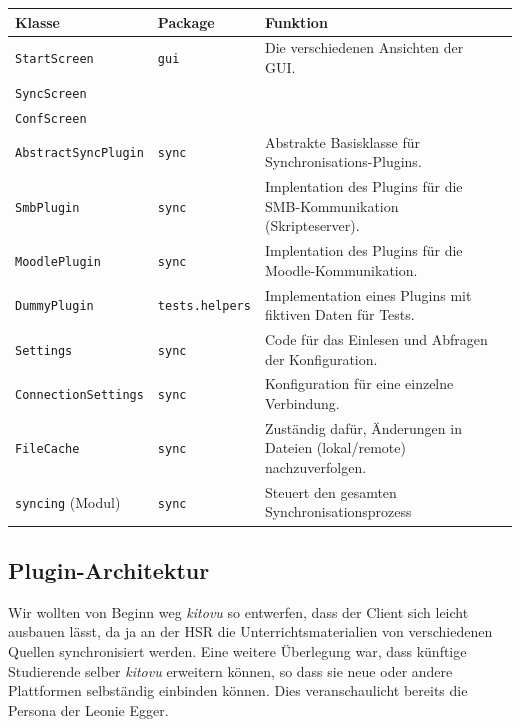 \documentclass[a4paper]{article}
\begin{document}
\begin{tabulary}{\linewidth}{llLl}
	\toprule
	Klasse & Package & Funktion \\
	\midrule
  \verb|StartScreen| & \verb|gui| & Die verschiedenen Ansichten der GUI. \\
  \verb|SyncScreen| & & \\
  \verb|ConfScreen| & & \\
  \hline
  \verb|AbstractSyncPlugin| & \verb|sync| & Abstrakte Basisklasse für Synchronisations-Plugins. \\
  \verb|SmbPlugin| & \verb|sync| & Implentation des Plugins für die SMB-Kommunikation (Skripteserver). \\
  \verb|MoodlePlugin| & \verb|sync| & Implentation des Plugins für die Moodle-Kommunikation. \\
  \verb|DummyPlugin| & \verb|tests.helpers| & Implementation eines Plugins mit fiktiven Daten für Tests. \\
  \hline
  \verb|Settings| & \verb|sync| & Code für das Einlesen und Abfragen der Konfiguration. \\
  \verb|ConnectionSettings| & \verb|sync| & Konfiguration für eine einzelne Verbindung. \\
  \hline
  \verb|FileCache| & \verb|sync| & Zuständig dafür, Änderungen in Dateien (lokal/remote) nachzuverfolgen. \\
  \verb|syncing| (Modul) & \verb|sync| & Steuert den gesamten Synchronisationsprozess \\
	\bottomrule
\end{tabulary}

\pagebreak

\subsection{Plugin-Architektur}

Wir wollten von Beginn weg \emph{kitovu} so entwerfen, dass der Client sich leicht ausbauen lässt, da ja an der HSR die Unterrichtsmaterialien von verschiedenen Quellen synchronisiert werden. Eine weitere Überlegung war, dass künftige Studierende selber \emph{kitovu} erweitern können, so dass sie neue oder andere Plattformen selbständig einbinden können. Dies veranschaulicht bereits die Persona der Leonie Egger. 
\end{document}
